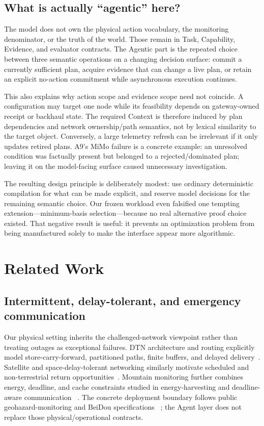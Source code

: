 \documentclass[journal,10pt]{IEEEtran}
\begin{document}
\subsection{What is actually ``agentic'' here?}
The model does not own the physical action vocabulary, the monitoring denominator, or the truth of
the world. Those remain in Task, Capability, Evidence, and evaluator contracts. The Agentic part is
the repeated choice between three semantic operations on a changing decision surface: commit a
currently sufficient plan, acquire evidence that can change a live plan, or retain an explicit
no-action commitment while asynchronous execution continues.

This also explains why action scope and evidence scope need not coincide. A configuration may
target one node while its feasibility depends on gateway-owned receipt or backhaul state. The
required Context is therefore induced by plan dependencies and network ownership/path semantics,
not by lexical similarity to the target object. Conversely, a large telemetry refresh can be
irrelevant if it only updates retired plans. A9's MiMo failure is a concrete example: an unresolved
condition was factually present but belonged to a rejected/dominated plan; leaving it on the
model-facing surface caused unnecessary investigation.

The resulting design principle is deliberately modest: use ordinary deterministic compilation for
what can be made explicit, and reserve model decisions for the remaining semantic choice. Our
frozen workload even falsified one tempting extension---minimum-basis selection---because no real
alternative proof choice existed. That negative result is useful: it prevents an optimization
problem from being manufactured solely to make the interface appear more algorithmic.

\section{Related Work}
\label{sec:related}
\subsection{Intermittent, delay-tolerant, and emergency communication}
Our physical setting inherits the challenged-network viewpoint rather than treating outages as
exceptional failures. DTN architecture and routing explicitly model store-carry-forward,
partitioned paths, finite buffers, and delayed delivery~\cite{fall2003dtn,jain2004dtnrouting,dtnarch,rfc5050,rfc9171,iranmaneshdtnqueue}.
Satellite and space-delay-tolerant networking similarly motivate scheduled and non-terrestrial
return opportunities~\cite{ccsdssabr,sateriot}. Mountain monitoring further combines energy,
deadline, and cache constraints studied in energy-harvesting and deadline-aware communication
~\cite{zakeri2311,costa2014pm,kam2016deadline,krishnan2019multihop,leboudec01,wada2009timeout}.
The concrete deployment boundary follows public geohazard-monitoring and BeiDou specifications
~\cite{dzt0450,dzt0460,bdsps3}; the Agent layer does not replace those physical/operational
contracts.
\end{document}
